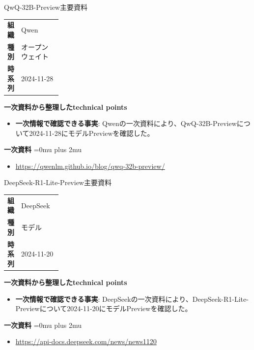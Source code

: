 \begin{technicalnote}{QwQ-32B-Preview}{主要資料}
\begingroup
\begin{tabularx}{\linewidth}{@{}>{\bfseries}p{0.22\linewidth}X@{}}
組織 & Qwen \\
種別 & オープンウェイト \\
時系列 & 2024-11-28 \\
\end{tabularx}
\smallskip
{\bfseries 一次資料から整理したtechnical points}
\begin{itemize}[leftmargin=1.5em,itemsep=0.35em]
\item \textbf{一次情報で確認できる事実}: Qwenの一次資料により、QwQ-32B-Previewについて2024-11-28にモデルPreviewを確認した。
\end{itemize}
\begin{minipage}{\linewidth}
\begin{samepage}
{\bfseries 一次資料}
\begingroup\sloppy
\Urlmuskip=0mu plus 2mu\relax
\begin{itemize}[leftmargin=1.5em,itemsep=0.25em]
\item {\scriptsize\url{https://qwenlm.github.io/blog/qwq-32b-preview/}}
\end{itemize}
\endgroup
\end{samepage}
\end{minipage}
\endgroup
\end{technicalnote}
\medskip

\begin{technicalnote}{DeepSeek-R1-Lite-Preview}{主要資料}
\begingroup
\begin{tabularx}{\linewidth}{@{}>{\bfseries}p{0.22\linewidth}X@{}}
組織 & DeepSeek \\
種別 & モデル \\
時系列 & 2024-11-20 \\
\end{tabularx}
\smallskip
{\bfseries 一次資料から整理したtechnical points}
\begin{itemize}[leftmargin=1.5em,itemsep=0.35em]
\item \textbf{一次情報で確認できる事実}: DeepSeekの一次資料により、DeepSeek-R1-Lite-Previewについて2024-11-20にモデルPreviewを確認した。
\end{itemize}
\begin{minipage}{\linewidth}
\begin{samepage}
{\bfseries 一次資料}
\begingroup\sloppy
\Urlmuskip=0mu plus 2mu\relax
\begin{itemize}[leftmargin=1.5em,itemsep=0.25em]
\item {\scriptsize\url{https://api-docs.deepseek.com/news/news1120}}
\end{itemize}
\endgroup
\end{samepage}
\end{minipage}
\endgroup
\end{technicalnote}
\medskip

